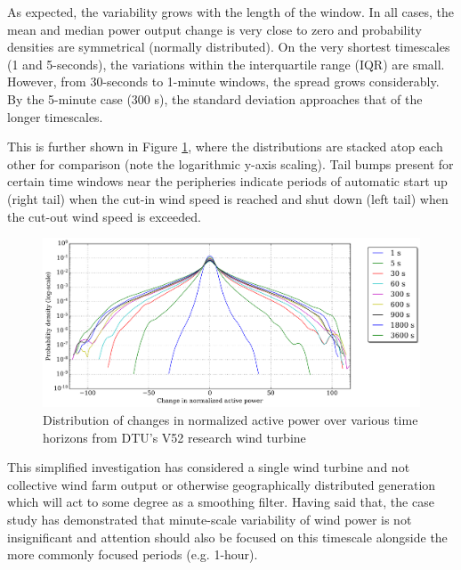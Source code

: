 \begin{table}
    \centering
    \caption{Table of statistics for V52 power output variability over selected time windows up to 1-hour}
    
    \label{tab:intro_v52_variability_statistics}
\end{table}

As expected, the variability grows with the length of the window. In all cases, the mean and median power output change is very close to zero and probability densities are symmetrical (normally distributed). On the very shortest timescales (1 and 5-seconds), the variations within the interquartile range (IQR) are small. However, from 30-seconds to 1-minute windows, the spread grows considerably. By the 5-minute case (300 s), the standard deviation approaches that of the longer timescales.

This is further shown in Figure \ref{fig:norm_act_pow_error_dist}, where the distributions are stacked atop each other for comparison (note the logarithmic y-axis scaling). Tail bumps present for certain time windows near the peripheries indicate periods of automatic start up (right tail) when the cut-in wind speed is reached and shut down (left tail) when the cut-out wind speed is exceeded.

\begin{figure}[htbp]
    \centering
        \includegraphics[width=1.0\textwidth]{graphics/intro/variability/norm_act_pow_error_dist.png}
    \caption{Distribution of changes in normalized active power over various time horizons from DTU's V52 research wind turbine}
    \label{fig:norm_act_pow_error_dist}
\end{figure}

This simplified investigation has considered a single wind turbine and not collective wind farm output or otherwise geographically distributed generation which will act to some degree as a smoothing filter. Having said that, the case study has demonstrated that minute-scale variability of wind power is not insignificant and attention should also be focused on this timescale alongside the more commonly focused periods (e.g. 1-hour).

